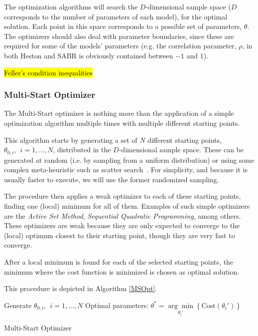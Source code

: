The optimization algorithms will search the $D$-dimensional sample space ($D$ corresponds to the number of parameters of each model), for the optimal solution. Each point in this space corresponds to a possible set of parameters, $\theta$.
The optimizers should also deal with parameter boundaries, since these are required for some of the models' parameters (e.g. the correlation parameter, $\rho$, in both Heston and SABR is obviously contained between $-1$ and $1$).

\hl{Feller's condition inequalities}

\subsubsection{Multi-Start Optimizer}
The Multi-Start optimizer is nothing more than the application of a simple optimization algorithm multiple times with multiple different starting points.


This algorithm starts by generating a set of $N$ different starting points, $\theta_{0,i},\ \ i=1,\ldots,N$, distributed in the $D$-dimensional sample space. These can be generated at random (i.e. by sampling from a uniform distribution) or using some complex meta-heuristic such as scatter search~\cite{Ugray}. For simplicity, and because it is usually faster to execute, we will use the former randomized sampling.


The procedure then applies a weak optimizer to each of these starting points, finding one (local) minimum for all of them. Examples of such simple optimizers are the \emph{Active Set Method}, \emph{Sequential Quadratic Programming}, among others. These optimizers are weak because they are only expected to converge to the (local) optimum closest to their starting point, though they are very fast to converge.

After a local minimum is found for each of the selected starting points, the minimum where the cost function is minimized is chosen as optimal solution.

This procedure is depicted in Algorithm \ref{MSOpt}.

\begin{algorithm}[H]\label{MSOpt}
\DontPrintSemicolon
Generate $\theta_{0,i},\ \ i=1,\ldots,N$
 Optimal parameters: $\theta^{*}=\underset{\theta_i'}{\arg\min}\left\{\mathrm{Cost}(\theta_i')\right\}$\;
 \caption{Multi-Start Optimizer}
\end{algorithm}
\ 

